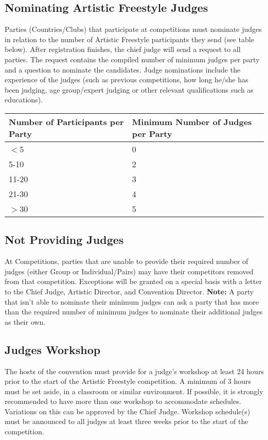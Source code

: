 \subsection{Nominating Artistic Freestyle Judges \label{subsec:freestyle_judging-panel_nominating-freestyle-judges}}
Parties (Countries/Clubs) that participate at competitions must nominate judges in relation to the number of Artistic Freestyle participants they send (see table below). 
After registration finishes, the chief judge will send a request to all parties.
The request contains the compiled number of minimum judges per party and a question to nominate the candidates.
Judge nominations include the experience of the judges (such as previous competitions, how long he/she has been judging, age group/expert judging or other relevant qualifications such as educations).

\begin{tabular}{|l|l|}
\hline
\textbf{Number of Participants per Party} & \textbf{Minimum Number of Judges per Party} \\
\hline
$<$5 & 0 \\
\hline
5-10 & 2 \\
\hline
11-20 & 3 \\
\hline
21-30 & 4 \\
\hline
$>$30 & 5 \\
\hline
\end{tabular}

\subsection{Not Providing Judges}
At Competitions, parties that are unable to provide their required number of judges (either Group or Individual/Pairs) may have their competitors removed from that competition.
Exceptions will be granted on a special basis with a letter to the Chief Judge, Artistic Director, and Convention Director. 
\textbf{Note:} A party that isn't able to nominate their minimum judges can ask a party that has more than the required number of minimum judges to nominate their additional judges as their own.

\subsection{Judges Workshop}
The hosts of the convention must provide for a judge's workshop at least 24 hours prior to the start of the Artistic Freestyle competition.
A minimum of 3 hours must be set aside, in a classroom or similar environment.
If possible, it is strongly recommended to have more than one workshop to accommodate schedules.
Variations on this can be approved by the Chief Judge.
Workshop schedule(s) must be announced to all judges at least three weeks prior to the start of the competition.

